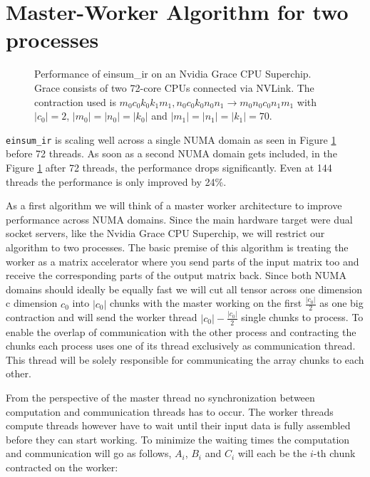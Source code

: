 

\section{Master-Worker Algorithm for two processes}

\begin{figure}[ht]
  \caption{
    Performance of einsum\_ir on an Nvidia Grace CPU Superchip.
    Grace consists of two 72-core CPUs connected via NVLink.
    The contraction used is $m_0c_0k_0k_1m_1, n_0c_0k_0n_0n_1 \rightarrow m_0n_0c_0n_1m_1$ with $|c_0|=2$, $|m_0|=|n_0|=|k_0|$ and $|m_1|=|n_1|=|k_1|=70$.
  }
  \label{fig:perf_threads}
\end{figure}

\texttt{einsum\_ir} is scaling well across a single NUMA domain as seen in Figure \ref{fig:perf_threads} before 72 threads.
As soon as a second NUMA domain gets included, in the Figure \ref{fig:perf_threads} after 72 threads, the performance drops significantly.
Even at 144 threads the performance is only improved by 24\%.

As a first algorithm we will think of a master worker architecture to improve performance across NUMA domains.
Since the main hardware target were dual socket servers, like the Nvidia Grace CPU Superchip, we will restrict our algorithm to two processes.
The basic premise of this algorithm is treating the worker as a matrix accelerator where you send parts of the input matrix too and receive the corresponding parts of the output matrix back.
Since both NUMA domains should ideally be equally fast we will cut all tensor across one dimension c dimension $c_0$ into $|c_0|$ chunks with the master working on the first $\frac{|c_0|}{2}$ as one big contraction and will send the worker thread $|c_0|-\frac{|c_0|}{2}$ single chunks to process.
To enable the overlap of communication with the other process and contracting the chunks each process uses one of its thread exclusively as communication thread.
This thread will be solely responsible for communicating the array chunks to each other.

From the perspective of the master thread no synchronization between computation and communication threads has to occur.
The worker threads compute threads however have to wait until their input data is fully assembled before they can start working.
To minimize the waiting times the computation and communication will go as follows, $A_i$, $B_i$ and $C_i$ will each be the $i$-th chunk contracted on the worker:

